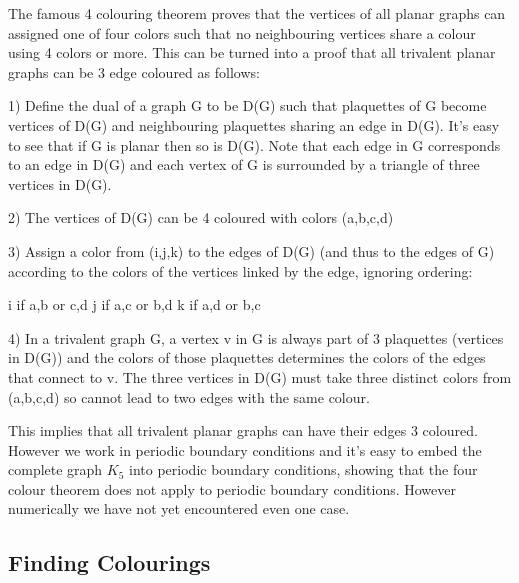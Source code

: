 The famous 4 colouring theorem proves that the vertices of all planar graphs can assigned one of four colors such that no neighbouring vertices share a colour using 4 colors or more. This can be turned into a proof that all trivalent planar graphs can be 3 edge coloured as follows:

1) Define the dual of a graph G to be D(G) such that plaquettes of G become vertices of D(G) and neighbouring plaquettes sharing an edge in D(G). It's easy to see that if G is planar then so is D(G). Note that each edge in G corresponds to an edge in D(G) and each vertex of G is surrounded by a triangle of three vertices in D(G).

2) The vertices of D(G) can be 4 coloured with colors (a,b,c,d)

3) Assign a color from (i,j,k) to the edges of D(G) (and thus to the edges of G) according to the colors of the vertices linked by the edge, ignoring ordering:

i if {a,b} or {c,d}
j if {a,c} or {b,d}
k if {a,d} or {b,c}

4) In a trivalent graph G, a vertex v in G is always part of 3 plaquettes (vertices in D(G)) and the colors of those plaquettes determines the colors of the edges that connect to v. The three vertices in D(G) must take three distinct colors from (a,b,c,d) so cannot lead to two edges with the same colour.

This implies that all trivalent planar graphs can have their edges 3 coloured. However we work in periodic boundary conditions and it's easy to embed the complete graph \(K_5\) into periodic boundary conditions, showing that the four colour theorem does not apply to periodic boundary conditions. However numerically we have not yet encountered even one case.


\subsection{Finding Colourings}


